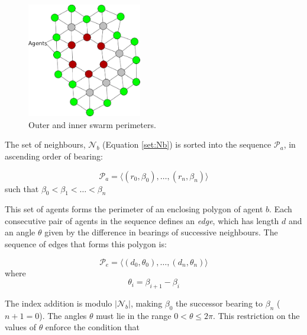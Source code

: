 \documentclass[letterpaper]{article}
\begin{document}
\begin{figure}
\begin{center}
\includegraphics[width=5cm]{figures/PerimeterBots1}
\end{center}
\caption{{\color{green}Outer} and {\color{red}inner} swarm perimeters. \label{fig:PerimeterBots1}}
\end{figure}



The set of neighbours, $\mathcal N_b$ (Equation \ref{set:Nb}) is sorted into the sequence $\mathcal P_a$, in ascending order of bearing: 

\begin{equation}
	\mathcal P_a = \langle (r_0,\beta_0),\ldots,(r_n,\beta_n) \rangle
\end{equation}
such that $\beta_0 < \beta_1 < \ldots < \beta_n$

This set of agents forms the perimeter of an enclosing polygon of agent $b$. Each consecutive pair of agents in the sequence defines an {\it edge}, which has length $d$ and an angle $\theta$ given by the difference in bearings of successive neighbours. The sequence of edges that forms this polygon is:

\begin{equation}
	\mathcal{P}_e = \langle (d_0,\theta_0), \ldots , (d_n,\theta_n) \rangle
\end{equation}
where
\begin{equation}
	\theta_i = \beta_{i+1} - \beta_i
\end{equation}

The index addition is modulo $|\mathcal N_b|$, making $\beta_0$ the successor bearing to $\beta_n$ ($n+1 = 0$).  The angles $\theta$ must lie in the range $0<\theta\leq2\pi$. This restriction on the values of $\theta$ enforce the condition that
\end{document}
